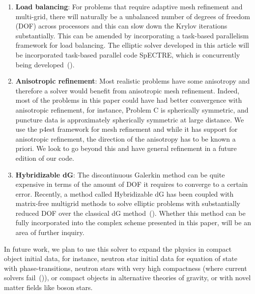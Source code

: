 \begin{enumerate}
\item {\bf Load balancing}: For problems that require adaptive mesh
  refinement and multi-grid, there will naturally be a unbalanced
  number of degrees of freedom (DOF) across processors and this can
  slow down the Krylov iterations substantially. This can be amended
  by incorporating a task-based parallelism framework for load
  balancing.  The elliptic solver developed in this article will be incorporated  task-based parallel code SpECTRE, which is concurrently being developed~(\citet*{kidder:16}).
\item {\bf Anisotropic refinement}: Most realistic problems have some
  anisotropy and therefore a solver would benefit from anisotropic
  mesh refinement.  Indeed, most of the problems in this paper could
  have had better convergence with anisotropic refinement, for instance, Problem C is spherically symmetric, and puncture data is approximately spherically symmetric at large distance.  We use the
  p4est framework for mesh refinement and while it has support for
  anisotropic refinement, the direction of the anisotropy has to be
  known a priori. We look to go beyond this and have general
  refinement in a future edition of our code.
\item {\bf Hybridizable dG}: The discontinuous Galerkin method can be quite
  expensive in terms of the amount of DOF it requires to converge to a
  certain error. Recently, a method called Hybridizable dG has been
  coupled with matrix-free multigrid methods to solve elliptic
  problems with substantially reduced DOF over the classical dG
  method~(\citet*{fabien2019manycore,muralikrishnan2019multilevel}). Whether
  this method can be fully incorporated into the complex scheme
  presented in this paper, will be an area of further inquiry.
\end{enumerate}

In future work, we plan to use this solver to expand the physics in
compact object initial data, for instance, neutron star initial data
for equation of state with phase-transitions, neutron stars with
very high compactness (where current solvers fail~(\citet*{henriksson:2014tba})),
or compact objects in alternative theories of gravity, or with novel matter fields like boson stars.


%
